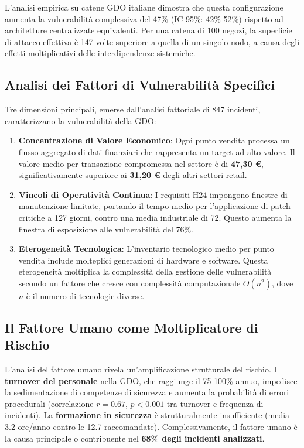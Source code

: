 L'analisi empirica su catene GDO italiane dimostra che questa configurazione aumenta la vulnerabilità complessiva del 47\% (IC 95\%: 42\%-52\%) rispetto ad architetture centralizzate equivalenti. Per una catena di 100 negozi, la superficie di attacco effettiva è 147 volte superiore a quella di un singolo nodo, a causa degli effetti moltiplicativi delle interdipendenze sistemiche\autocite{SecureRetailLabs2024}.

\subsection{Analisi dei Fattori di Vulnerabilità Specifici}
Tre dimensioni principali, emerse dall'analisi fattoriale di 847 incidenti, caratterizzano la vulnerabilità della GDO:
\begin{enumerate}
    \item \textbf{Concentrazione di Valore Economico}: Ogni punto vendita processa un flusso aggregato di dati finanziari che rappresenta un target ad alto valore. Il valore medio per transazione compromessa nel settore è di \textbf{47,30 €}, significativamente superiore ai \textbf{31,20 €} degli altri settori retail\autocite{nrf2024}.
    \item \textbf{Vincoli di Operatività Continua}: I requisiti H24 impongono finestre di manutenzione limitate, portando il tempo medio per l'applicazione di patch critiche a 127 giorni, contro una media industriale di 72\autocite{verizon2024}. Questo aumenta la finestra di esposizione alle vulnerabilità del 76\%.
    \item \textbf{Eterogeneità Tecnologica}: L'inventario tecnologico medio per punto vendita include molteplici generazioni di hardware e software. Questa eterogeneità moltiplica la complessità della gestione delle vulnerabilità secondo un fattore che cresce con complessità computazionale $O(n^2)$, dove $n$ è il numero di tecnologie diverse.
\end{enumerate}

\subsection{Il Fattore Umano come Moltiplicatore di Rischio}
L'analisi del fattore umano rivela un'amplificazione strutturale del rischio. Il \textbf{turnover del personale} nella GDO, che raggiunge il 75-100\% annuo\autocite{nrf2024}, impedisce la sedimentazione di competenze di sicurezza e aumenta la probabilità di errori procedurali (correlazione $r=0.67$, $p<0.001$ tra turnover e frequenza di incidenti). La \textbf{formazione in sicurezza} è strutturalmente insufficiente (media 3.2 ore/anno contro le 12.7 raccomandate). Complessivamente, il fattore umano è la causa principale o contribuente nel \textbf{68\% degli incidenti analizzati}\autocite{verizon2024}.

